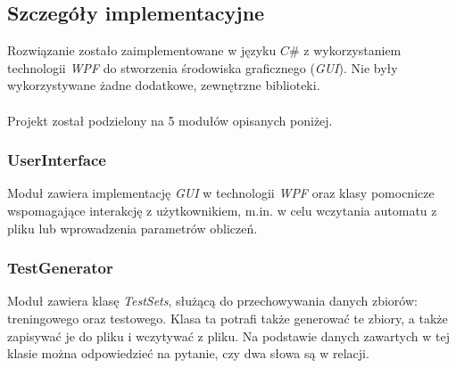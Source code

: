 \documentclass{../llncs_template_final/llncs}
\begin{document}
%

\subsection{Szczegóły implementacyjne}

Rozwiązanie zostało zaimplementowane w języku $C\#$ z wykorzystaniem technologii \emph{WPF} do stworzenia środowiska graficznego (\emph{GUI}). Nie były wykorzystywane żadne dodatkowe, zewnętrzne biblioteki.
\\
\\
Projekt został podzielony na 5 modułów opisanych poniżej.

\subsubsection*{UserInterface}
Moduł zawiera implementację \emph{GUI} w technologii \emph{WPF} oraz klasy pomocnicze wspomagające interakcję z użytkownikiem, m.in. w celu wczytania automatu z pliku lub wprowadzenia parametrów obliczeń.

\subsubsection*{TestGenerator}
Moduł zawiera klasę \emph{TestSets}, służącą do przechowywania danych zbiorów: treningowego oraz testowego. Klasa ta potrafi także generować te zbiory, a także zapisywać je do pliku i wczytywać z pliku. Na podstawie danych zawartych w tej klasie można odpowiedzieć na pytanie, czy dwa słowa są w relacji.
\end{document}
